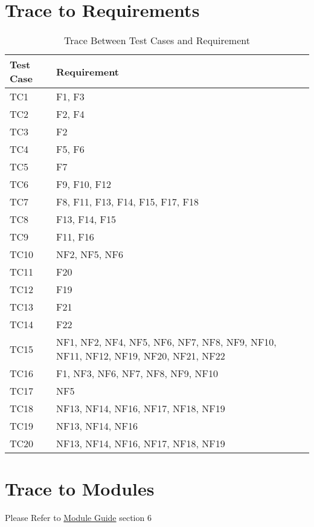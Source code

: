 \documentclass[12pt, titlepage]{article}
\begin{document}
\section{Trace to Requirements}

\begin{table}[H]
\centering
\begin{tabular}{p{} p{}}
\toprule
\textbf{Test Case} & \textbf{Requirement}\\
\midrule
TC1  & F1, F3\\
TC2  & F2, F4\\
TC3  & F2\\
TC4  & F5, F6\\
TC5  & F7\\
TC6  & F9, F10, F12\\
TC7  & F8, F11, F13, F14, F15, F17, F18\\
TC8  & F13, F14, F15\\
TC9  & F11, F16\\
TC10 & NF2, NF5, NF6\\
TC11 & F20\\
TC12 & F19\\
TC13 & F21\\
TC14 & F22\\
TC15 & NF1, NF2, NF4, NF5, NF6, NF7, NF8, NF9, NF10, NF11, NF12, NF19, NF20, NF21, NF22\\
TC16 & F1, NF3, NF6, NF7, NF8, NF9, NF10\\
TC17 & NF5\\
TC18 & NF13, NF14, NF16, NF17, NF18, NF19\\
TC19 & NF13, NF14, NF16\\
TC20 & NF13, NF14, NF16, NF17, NF18, NF19\\

\bottomrule
\end{tabular}
\caption{Trace Between Test Cases and Requirement}
\end{table}

\section{Trace to Modules}
Please Refer to \href{https://gitlab.cas.mcmaster.ca/nagyj2/Staroids/blob/master/Doc/Design/MG/MG.pdf}{Module Guide} section 6
\end{document}

